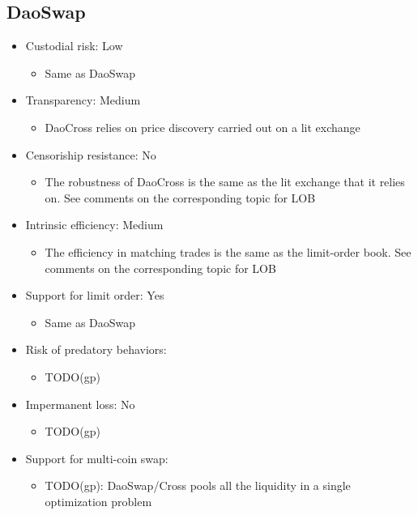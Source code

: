 \documentclass[11pt, reqno]{amsart}
\begin{document}
\subsection{DaoSwap}

\begin{itemize}
	\item Custodial risk: Low
	      \begin{itemize}
		      \item Same as DaoSwap
	      \end{itemize}
	\item Transparency: Medium
	      \begin{itemize}
		      \item DaoCross relies on price discovery carried out on a lit exchange
	      \end{itemize}
	\item Censoriship resistance: No
	      \begin{itemize}
		      \item The robustness of DaoCross is the same as the lit exchange that it relies on. See comments on the corresponding topic for LOB
	      \end{itemize}
	\item Intrinsic efficiency: Medium
	      \begin{itemize}
		      \item The efficiency in matching trades is the same as the limit-order book. See comments on the corresponding topic for LOB
	      \end{itemize}
	\item Support for limit order: Yes
	      \begin{itemize}
		      \item Same as DaoSwap
	      \end{itemize}
	\item Risk of predatory behaviors:
	      \begin{itemize}
		      \item TODO(gp)
	      \end{itemize}
	\item Impermanent loss: No
	      \begin{itemize}
		      \item TODO(gp)
	      \end{itemize}
	\item Support for multi-coin swap:
	      \begin{itemize}
		      \item TODO(gp): DaoSwap/Cross pools all the liquidity in a single optimization problem
	      \end{itemize}
\end{itemize}
\end{document}
